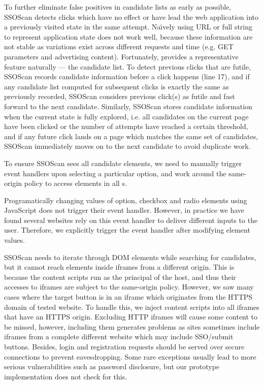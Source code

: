  To further eliminate false positives in candidate lists as early as possible, SSOScan detects clicks which have no effect or have lead the web application into a previously visited state in the same attempt.  Na\"{\i}vely using URL or full  string to represent application state does not work well, because these information are not stable as variations exist across different requests and time (e.g. GET parameters and advertising content).  Fortunately,  provides a representative feature naturally --- the candidate list.  To detect previous clicks that are futile, SSOScan records candidate information before a click happens (line 17), and if any candidate list computed for subsequent clicks is exactly the same as previously recorded, SSOScan considers previous click(s) as futile and fast forward to the next candidate.  Similarly, SSOScan stores candidate information when the current state is fully explored, i.e. all candidates on the current page have been clicked or the number of attempts have reached a certain threshold, and if any future click lands on a page which matches the same set of candidates, SSOScan immediately moves on to the next candidate to avoid duplicate work.

To ensure SSOScan sees all candidate elements, we need to manually trigger event handlers upon selecting a particular option, and work around the same-origin policy to access elements in all s.

 Programatically changing values of option, checkbox and radio elements using JavaScript does not trigger their  event handler.  However, in practice we have found several websites rely on this event handler to deliver different inputs to the user.  Therefore, we explicitly trigger the event handler after modifying element values.

 SSOScan needs to iterate through DOM elements while searching for candidates, but it cannot reach elements inside iframes from a different origin.  This is because the content scripts run as the principal of the host, and thus their accesses to iframes are subject to the same-origin policy.  However, we saw many cases where the target button is in an iframe which originates from the HTTPS domain of tested website.  To handle this, we inject content scripts into all iframes that have an HTTPS origin.  Excluding HTTP iframes will cause some content to be missed, however, including them generates problems as sites sometimes include iframes from a complete different website which may include SSO/submit buttons.  Besides, login and registration requests should be served over secure connections to prevent eavesdropping.  Some rare exceptions usually lead to more serious vulnerabilities such as password disclosure, but our prototype implementation does not check for this.

